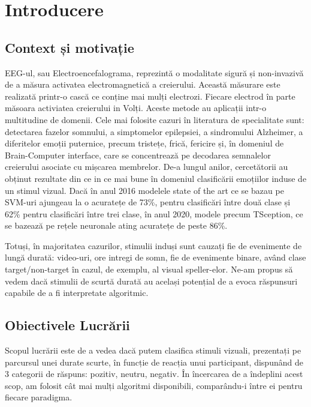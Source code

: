 \chapter{Introducere}

\section{Context și motivație}
EEG-ul, sau Electroencefalograma, reprezintă o modalitate sigură și non-invazivă de a măsura activatea electromagnetică a creierului. Această măsurare este realizată printr-o cască ce conține mai mulți electrozi. Fiecare electrod în parte măsoara activiatea creierului in Volți. Aceste metode au aplicații intr-o multitudine de domenii. Cele mai folosite cazuri în literatura de specialitate sunt: detectarea fazelor somnului, a simptomelor epilepsiei, a sindromului Alzheimer, a diferitelor emoții puternice, precum tristețe, frică, fericire și, în domeniul de Brain-Computer interface, care se concentrează pe decodarea semnalelor creierului asociate cu mișcarea membrelor.
De-a lungul anilor, cercetătorii au obținut rezultate din ce in ce mai bune în domeniul clasificării emoțiilor induse de un stimul vizual. Dacă în anul 2016 modelele state of the art ce se bazau pe SVM-uri ajungeau la o acuratețe de 73\%\cite{ATKINSON201635}, pentru clasificări între două clase și 62\% pentru clasificări între trei clase, în anul 2020, modele precum TSception, ce se bazează pe rețele neuronale ating acuratețe de peste 86\%\cite{TSception}. 

Totuși, în majoritatea cazurilor, stimulii induși sunt cauzați fie de evenimente de lungă durată: video-uri, ore intregi de somn, fie de evenimente binare, având clase target/non-target în cazul, de exemplu, al visual speller-elor\cite{visual_speller}. Ne-am propus să vedem dacă stimulii de scurtă durată au același potențial de a evoca răspunsuri capabile de a fi interpretate algoritmic.

\section{Obiectivele Lucrării}
Scopul lucrării este de a vedea dacă putem clasifica stimuli vizuali, prezentați pe parcursul unei durate scurte, în funcție de reacția unui participant, dispunând de 3 categorii de răspuns: pozitiv, neutru, negativ. În încercarea de a îndeplini acest scop, am folosit cât mai mulți algoritmi disponibili, comparându-i între ei pentru fiecare paradigma.

